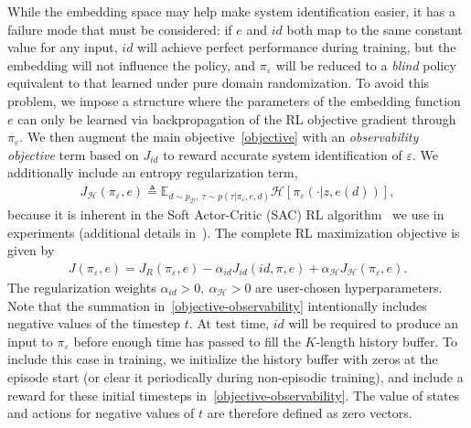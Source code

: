 \documentclass{article}
\newcommand{\E}{\mathbb{E}}
\newcommand{\cH}{\mathcal{H}}
\newcommand{\blind}{\emph{blind}}
\newcommand{\embedfn}{e}
\newcommand{\idfn}{id}
\newcommand{\idset}{\mathcal{D}}
\newcommand{\obvar}{z}
\newcommand{\idvar}{d}
\newcommand{\idpdf}{p_{\idset}}
\newcommand{\latvar}{\varepsilon}
\begin{document}
While the embedding space may help make system identification easier,
it has a failure mode that must be considered:
if $\embedfn$ and $\idfn$ both map to the same constant value for any input,
$\idfn$ will achieve perfect performance during training,
but the embedding will not influence the policy, and $\pi_\latvar$ will be reduced to a \blind{} policy
equivalent to that learned under pure domain randomization.
To avoid this problem, we impose a structure where the parameters of the embedding function $e$
can only be learned via backpropagation of the RL objective gradient through $\pi_\latvar$.
We then augment the main objective~\eqref{objective} with an \emph{observability objective} term based on $J_{\idfn}$
to reward accurate system identification of $\latvar$.
We additionally include an entropy regularization term,
\begin{equation}\begin{split}
J_{\cH}(\pi_\latvar, \embedfn) \triangleq \E_{\idvar \sim \idpdf,\ \tau \sim p(\tau|\pi_\latvar,\embedfn,\idvar)}
\cH
\left[
\pi_\latvar(\cdot |\obvar, \embedfn(\idvar))
\right],
\label{objective-entropy}
\end{split}\end{equation}
because it is inherent in the Soft Actor-Critic (SAC) RL algorithm~\citep{haarnoja-soft-actor-critic} we use in experiments (additional details in~).
The complete RL maximization objective is given by
\begin{equation}\begin{split}
J(\pi_\latvar, \embedfn) = J_R(\pi_\latvar, \embedfn) - \alpha_{id} J_{\idfn}(\idfn, \pi, \embedfn) + \alpha_{\cH} J_{\cH}(\pi_\latvar, \embedfn).
\label{objective-full}
\end{split}\end{equation}
The regularization weights $\alpha_{id} > 0,\ \alpha_{\cH} > 0$ are user-chosen hyperparameters.
Note that the summation in~\eqref{objective-observability} intentionally includes negative values of the timestep $t$.
At test time, $\idfn$ will be required to produce an input to $\pi_\latvar$
before enough time has passed to fill the $K$-length history buffer.
To include this case in training, we initialize the history buffer with zeros at the episode start (or clear it periodically during non-episodic training),
and include a reward for these initial timesteps in~\eqref{objective-observability}.
The value of states and actions for negative values of $t$ are therefore defined as zero vectors.
\end{document}
